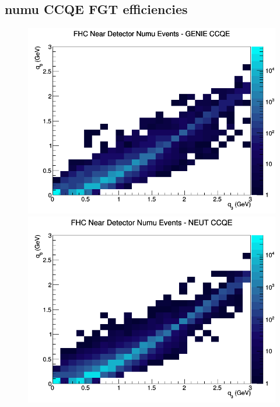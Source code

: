 \documentclass[12pt]{article}
\begin{document}
\subsection{numu CCQE FGT efficiencies}
\begin{figure}[h]
\includegraphics[width=\linewidth]{eff_q0_q3/FGT/CCQE_FHC_ND_numu_q3_q0_GENIE.png}
\endminipage
{}
\includegraphics[width=\linewidth]{eff_q0_q3/FGT/CCQE_FHC_ND_numu_q3_q0_NEUT.png}
\endminipage
{}

\end{figure}
\end{document}
